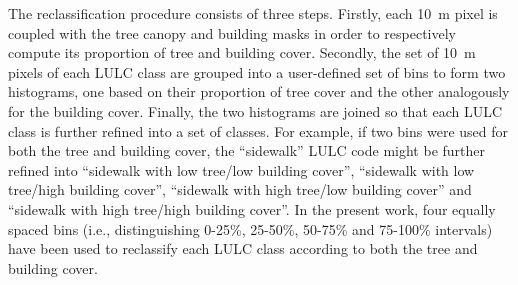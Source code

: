 \documentclass[12pt]{iopart}
\begin{document}
The reclassification procedure consists of three steps.
Firstly, each 10~m pixel is coupled with the tree canopy and building masks in order to respectively compute its proportion of tree and building cover.
Secondly, the set of 10~m pixels of each LULC class are grouped into a user-defined set of bins to form two histograms, one based on their proportion of tree cover and the other analogously for the building cover.
Finally, the two histograms are joined so that each LULC class is further refined into a set of classes. For example, if two bins were used for both the tree and building cover, the ``sidewalk'' LULC code might be further refined into ``sidewalk with low tree/low building cover'', ``sidewalk with low tree/high building cover'', ``sidewalk with high tree/low building cover'' and ``sidewalk with high tree/high building cover''.
In the present work, four equally spaced bins (i.e., distinguishing 0-25\%, 25-50\%, 50-75\% and 75-100\% intervals) have been used to reclassify each LULC class according to both the tree and building cover.
\end{document}
